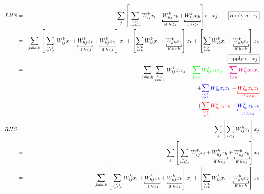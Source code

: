 \begin{eqnarray}
LHS &=& \sum_j \left[ \sum_{i < j \atop i \neq h,k} W^k_{ij} x_i + \underbracket[1pt]{W^k_{hj} x_k}_{\text{if } h < j} + \underbracket[1pt]{W^k_{kj} x_h}_{\text{if } k < j} \right] \sigma \cdot x_j \quad \quad \boxed{\text{apply } \sigma \cdot x_i} \nonumber \\
&=& \sum_{j \neq h,k} \left[ \sum_{i < j \atop i \neq h,k} W^k_{ij} x_i + \underbracket[1pt]{W^k_{hj} x_k}_{\text{if } h < j} + \underbracket[1pt]{W^k_{kj} x_h}_{\text{if } k < j} \right] x_j
+ \left[ \sum_{i < h \atop i \neq k} W^k_{ih} x_i + \underbracket[1pt]{W^k_{kh} x_h}_{\text{if } k < h} \right] x_k
+ \left[ \sum_{i < k \atop i \neq h} W^k_{ik} x_i + \underbracket[1pt]{W^k_{hk} x_k}_{\text{if } h < k} \right] x_h \nonumber \\
& & \boxed{\text{apply } \sigma \cdot x_j} \nonumber \\
&=& \sum_{j \neq h,k} \sum_{i < j \atop i \neq h,k} W^k_{ij} x_i x_j + {\color{green}\sum_{j > h} W^k_{hj} x_k x_j} + {\color{magenta}\sum_{j > k} W^k_{kj} x_h x_j} \nonumber \\
&& + {\color{blue}\sum_{i < h \atop i \neq k} W^k_{ih} x_i x_k} + {\color{red}\underbracket[1pt]{W^k_{kh} x_h x_k}_{\text{if } k < h}} \nonumber \\
&& + {\color{red}\sum_{i < k \atop i \neq h} W^k_{ik} x_i x_h} + {\color{blue}\underbracket[1pt]{W^k_{hk} x_k x_h}_{\text{if } h < k}} \nonumber \\
RHS &=& \sum_j \left[ \sum_{i < j} W_{ij}^h x_i \right] x_j \nonumber \\
&=& \sum_j \left[ \sum_{i < j \atop i \neq h,k} W^h_{ij} x_i + \underbracket[1pt]{W^h_{hj} x_h}_{\text{if } h < j} + \underbracket[1pt]{W^h_{kj} x_k}_{\text{if } k < j} \right] x_j \nonumber \\
&=& \sum_{j \neq h,k} \left[ \sum_{i < j \atop i \neq h,k} W^h_{ij} x_i + \underbracket[1pt]{W^h_{hj} x_h}_{\text{if } h < j} + \underbracket[1pt]{W^h_{kj} x_k}_{\text{if } k < j} \right] x_j
+ \left[ \sum_{i < h \atop i \neq k} W^h_{ih} x_i + \underbracket[1pt]{W^h_{kh} x_k}_{\text{if } k < h} \right] x_h

\end{eqnarray}

